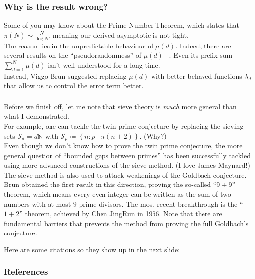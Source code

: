 
\begin{frame}\frametitle{Why is the result wrong?}
Some of you may know about the Prime Number Theorem, which states that \(\pi(N) \sim \frac{N}{\log N}\), meaning our derived asymptotic is not tight.
\pause \\[5px]

The reason lies in the unpredictable behaviour of \(\mu(d)\). Indeed, there are several results on the ``pseudorandomness'' of \(\mu(d)\) ~\cite{GreenTao12}. Even its prefix sum \(\sum_{d = 1}^N \mu(d)\) isn't well understood for a long time.
\pause \\[5px]

Instead, Viggo Brun suggested replacing \(\mu(d)\) with better-behaved functions \(\lambda_d\) that allow us to control the error term better.
\end{frame}

\begin{frame}\frametitle{\insertsubsection}
Before we finish off, let me note that sieve theory is \textit{much} more general than what I demonstrated.
\pause \\[5px]

For example, one can tackle the twin prime conjecture by replacing the sieving sets \(\mathcal{S}_d = d\mathbb{N}\) with \(\mathcal{S}_p \coloneqq \left\{n : p \mid n(n + 2)\right\}\). (Why?)
\pause \\[5px]

Even though we don't know how to prove the twin prime conjecture, the more general question of ``bounded gaps between primes'' has been successfully tackled using more advanced constructions of the sieve method. (I love James Maynard!)
\pause \\[5px]

The sieve method is also used to attack weakenings of the Goldbach conjecture. Brun obtained the first result in this direction, proving the so-called ``\(9 + 9\)'' theorem, which means every even integer can be written as the sum of two numbers with at most \(9\) prime divisors. The most recent breakthrough is the ``\(1 + 2\)'' theorem, achieved by Chen JingRun in 1966. Note that there are fundamental barriers that prevents the method from proving the full Goldbach's conjecture.

Here are some citations so they show up in the next slide: ~\cite{CojocaruMurty05} ~\cite{Greaves01} ~\cite{Liu22}
\end{frame}

\begin{frame}\frametitle{References}
\printbibliography
\end{frame}
